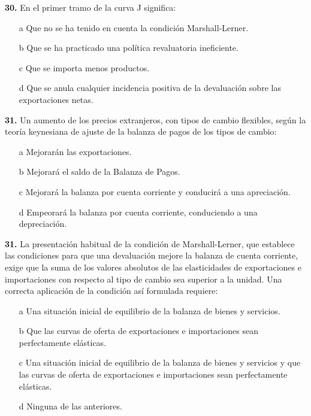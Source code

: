 \documentclass{nuevotema}
\begin{document}
\textbf{30.} En el primer tramo de la curva J significa:

\begin{itemize}
	\item[a] Que no se ha tenido en cuenta la condición Marshall-Lerner.
	\item[b] Que se ha practicado una política revaluatoria ineficiente.
	\item[c] Que se importa menos productos.
	\item[d] Que se anula cualquier incidencia positiva de la devaluación sobre las exportaciones netas.
\end{itemize}

\textbf{31.} Un aumento de los precios extranjeros, con tipos de cambio flexibles, según la teoría keynesiana de ajuste de la balanza de pagos de los tipos de cambio:
\begin{enumerate}
	\item[a] Mejorarán las exportaciones.
	\item[b] Mejorará el saldo de la Balanza de Pagos.
	\item[c] Mejorará la balanza por cuenta corriente y conducirá a una apreciación.
	\item[d] Empeorará la balanza por cuenta corriente, conduciendo a una depreciación.
\end{enumerate}


\textbf{31.} La presentación habitual de la condición de Marshall-Lerner, que establece las condiciones para que una devaluación mejore la balanza de cuenta corriente, exige que la suma de los valores absolutos de las elasticidades de exportaciones e importaciones con respecto al tipo de cambio sea superior a la unidad. Una correcta aplicación de la condición así formulada requiere:
\begin{itemize}
	\item[a] Una situación inicial de equilibrio de la balanza de bienes y servicios.
	\item[b] Que las curvas de oferta de exportaciones e importaciones sean perfectamente elásticas.
	\item[c] Una situación inicial de equilibrio de la balanza de bienes y servicios y que las curvas de oferta de exportaciones e importaciones sean perfectamente elásticas.
	\item[d] Ninguna de las anteriores.
\end{itemize}
\end{document}
